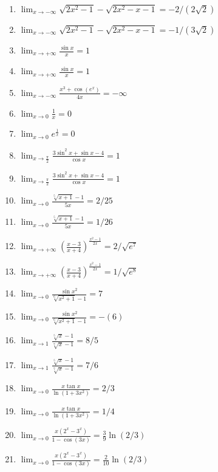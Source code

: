 \documentclass[11pt,a4paper]{article}
\begin{document}
\begin{enumerate}
\item $\displaystyle \lim_{x \to -\infty} \sqrt{2x^{2} - 1} - \sqrt{2x^{2} - x - 1} = -2/(2\sqrt{2})$
\item $\displaystyle \lim_{x \to -\infty} \sqrt{2x^{2} - 1} - \sqrt{2x^{2} - x - 1} = -1/(3\sqrt{2})$
\item $\displaystyle \lim_{x \to +\infty} \frac{\sin x}{x} = 1$
\item $\displaystyle \lim_{x \to +\infty} \frac{\sin x}{x} = 1$
\item $\displaystyle \lim_{x \to -\infty} \frac{x^{3} + \cos(e^{x})}{4x} = -\infty$
\item $\displaystyle \lim_{x \to 0} \frac{1}{x} = 0$
\item $\displaystyle \lim_{x \to 0} e^{\frac{1}{x}} = 0$
\item $\displaystyle \lim_{x \to \frac{\pi}{2}} \frac{3\sin^{2} x + \sin x - 4}{\cos x} = 1$
\item $\displaystyle \lim_{x \to \frac{\pi}{2}} \frac{3\sin^{2} x + \sin x - 4}{\cos x} = 1$
\item $\displaystyle \lim_{x \to 0} \frac{\sqrt[5]{x + 1} - 1}{5x} = 2/25$
\item $\displaystyle \lim_{x \to 0} \frac{\sqrt[5]{x + 1} - 1}{5x} = 1/26$
\item $\displaystyle \lim_{x \to +\infty} \left(\frac{x - 3}{x + 4}\right)^{\frac{x^{2} - 1}{2x}} = 2/\sqrt{e^{7}}$
\item $\displaystyle \lim_{x \to +\infty} \left(\frac{x - 3}{x + 4}\right)^{\frac{x^{2} - 1}{2x}} = 1/\sqrt{e^{8}}$
\item $\displaystyle \lim_{x \to 0} \frac{\sin x^{2}}{\sqrt[6]{x^{2} + 1} - 1} = 7$
\item $\displaystyle \lim_{x \to 0} \frac{\sin x^{2}}{\sqrt[6]{x^{2} + 1} - 1} = -\left(6\right)$
\item $\displaystyle \lim_{x \to 1} \frac{\sqrt[5]{x} - 1}{\sqrt[7]{x} - 1} = 8/5$
\item $\displaystyle \lim_{x \to 1} \frac{\sqrt[5]{x} - 1}{\sqrt[7]{x} - 1} = 7/6$
\item $\displaystyle \lim_{x \to 0} \frac{x\tan x}{\ln(1 + 3x^{2})} = 2/3$
\item $\displaystyle \lim_{x \to 0} \frac{x\tan x}{\ln(1 + 3x^{2})} = 1/4$
\item $\displaystyle \lim_{x \to 0} \frac{x(2^{x} - 3^{x})}{1 - \cos(3x)} = \frac{3}{9}\ln(2/3)$
\item $\displaystyle \lim_{x \to 0} \frac{x(2^{x} - 3^{x})}{1 - \cos(3x)} = \frac{2}{10}\ln(2/3)$

\end{enumerate}
\end{document}
